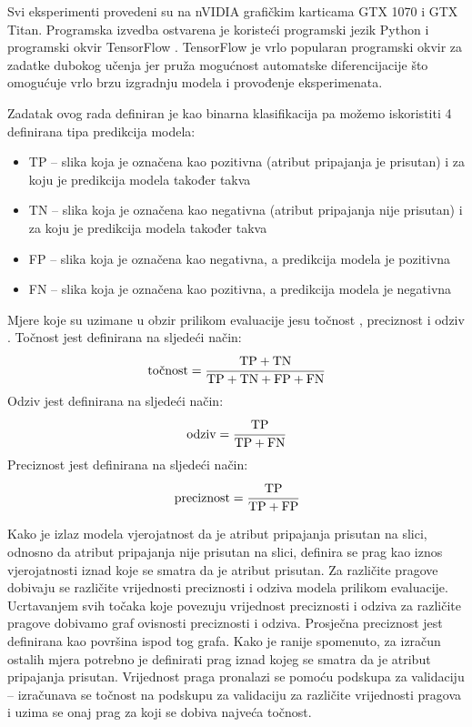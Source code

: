 \documentclass[times, utf8, diplomski, numeric]{fer}
\begin{document}
Svi eksperimenti provedeni su na nVIDIA grafičkim karticama GTX 1070 i GTX Titan. 
Programska izvedba ostvarena je koristeći programski jezik Python i programski okvir TensorFlow \citep{framework:tensorflow}.
TensorFlow je vrlo popularan programski okvir za zadatke dubokog učenja jer pruža mogućnost automatske diferencijacije što omogućuje vrlo brzu izgradnju modela i provođenje eksperimenata.

Zadatak ovog rada definiran je kao binarna klasifikacija pa možemo iskoristiti 4 definirana tipa predikcija modela: 
\begin{itemize}
 \item TP  -- slika koja je označena kao pozitivna (atribut pripajanja je prisutan) i za koju je predikcija modela također takva 
 \item TN  -- slika koja je označena kao negativna (atribut pripajanja nije prisutan) i za koju je predikcija modela također takva
 \item FP  -- slika koja je označena kao negativna, a predikcija modela je pozitivna
 \item FN  -- slika koja je označena kao pozitivna, a predikcija modela je negativna
\end{itemize}
Mjere koje su uzimane u obzir prilikom evaluacije jesu točnost , preciznost  i odziv . 
Točnost jest definirana na sljedeći način:
\begin{align}
 \text{točnost} = \cfrac{\text{TP} + \text{TN}}{\text{TP} + \text{TN} + \text{FP} + \text{FN}}
\end{align}
Odziv jest definirana na sljedeći način:
\begin{align}
 \text{odziv} = \cfrac{\text{TP}}{\text{TP} + \text{FN}}
\end{align}
Preciznost jest definirana na sljedeći način:
\begin{align}
 \text{preciznost} = \cfrac{\text{TP}}{\text{TP} + \text{FP}}
\end{align}

Kako je izlaz modela vjerojatnost da je atribut pripajanja prisutan na slici, odnosno da atribut pripajanja nije prisutan na slici, definira se prag kao iznos vjerojatnosti iznad koje se smatra da je atribut prisutan.
Za različite pragove dobivaju se različite vrijednosti preciznosti i odziva modela prilikom evaluacije. 
Ucrtavanjem svih točaka koje povezuju vrijednost preciznosti i odziva za različite pragove dobivamo graf ovisnosti preciznosti i odziva.
Prosječna preciznost jest definirana kao površina ispod tog grafa.
Kako je ranije spomenuto, za izračun ostalih mjera potrebno je definirati prag iznad kojeg se smatra da je atribut pripajanja prisutan.
Vrijednost praga pronalazi se pomoću podskupa za validaciju -- izračunava se točnost na podskupu za validaciju za različite vrijednosti pragova i uzima se onaj prag za koji se dobiva najveća točnost.
\end{document}
